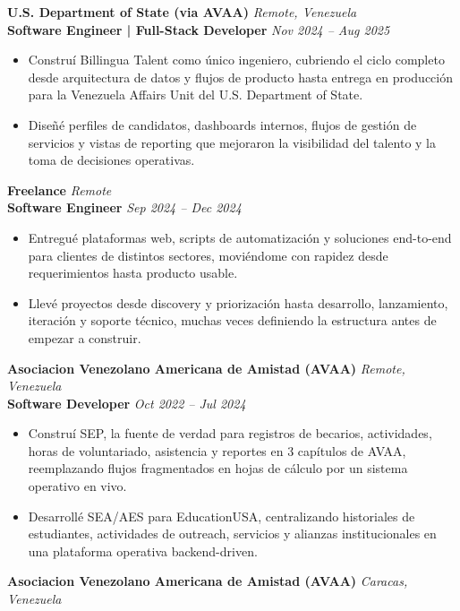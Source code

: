 \documentclass[11pt]{article}
\begin{document}
\vspace{10pt}
\textbf{U.S. Department of State (via AVAA)} \hfill \textit{Remote, Venezuela} \\
\textbf{Software Engineer | Full-Stack Developer} \hfill \textit{Nov 2024 -- Aug 2025}
\begin{itemize}
    \item Construí Billingua Talent como único ingeniero, cubriendo el ciclo completo desde arquitectura de datos y flujos de producto hasta entrega en producción para la Venezuela Affairs Unit del U.S. Department of State.
    \item Diseñé perfiles de candidatos, dashboards internos, flujos de gestión de servicios y vistas de reporting que mejoraron la visibilidad del talento y la toma de decisiones operativas.
\end{itemize}
\vspace{10pt}
\textbf{Freelance} \hfill \textit{Remote} \\
\textbf{Software Engineer} \hfill \textit{Sep 2024 -- Dec 2024}
\begin{itemize}
    \item Entregué plataformas web, scripts de automatización y soluciones end-to-end para clientes de distintos sectores, moviéndome con rapidez desde requerimientos hasta producto usable.
    \item Llevé proyectos desde discovery y priorización hasta desarrollo, lanzamiento, iteración y soporte técnico, muchas veces definiendo la estructura antes de empezar a construir.
\end{itemize}
\vspace{10pt}
\textbf{Asociacion Venezolano Americana de Amistad (AVAA)} \hfill \textit{Remote, Venezuela} \\
\textbf{Software Developer} \hfill \textit{Oct 2022 -- Jul 2024}
\begin{itemize}
    \item Construí SEP, la fuente de verdad para registros de becarios, actividades, horas de voluntariado, asistencia y reportes en 3 capítulos de AVAA, reemplazando flujos fragmentados en hojas de cálculo por un sistema operativo en vivo.
    \item Desarrollé SEA/AES para EducationUSA, centralizando historiales de estudiantes, actividades de outreach, servicios y alianzas institucionales en una plataforma operativa backend-driven.
\end{itemize}
\vspace{10pt}
\textbf{Asociacion Venezolano Americana de Amistad (AVAA)} \hfill \textit{Caracas, Venezuela} \\
\end{document}
